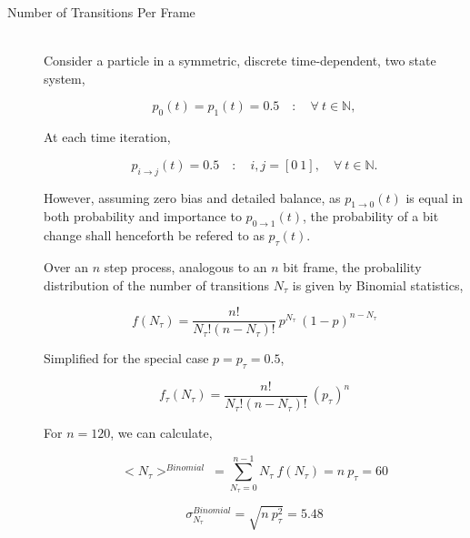 			\begin{description}
				\item[Number of Transitions Per Frame] \hfill \\
					
					Consider a particle in a symmetric, discrete time-dependent, two state system,

					\begin{equation}
						p_0(t) = p_1(t) = 0.5 \quad : \quad \forall\ t \in \mathbb{N},
					\end{equation}

					At each time iteration,

					\begin{equation}
						p_{i \to j}(t) = 0.5 \quad : \quad i,j = [0\ 1], \quad \forall\ t \in \mathbb{N}.
					\end{equation}

					However, assuming zero bias and detailed balance, as $p_{1 \to 0}(t)$ is equal in both probability and importance to $p_{0 \to 1}(t)$, the probability of a bit change shall henceforth be refered to as $p_{\tau}(t)$.
					\par
					Over an $n$ step process, analogous to an $n$ bit frame, the probalility distribution of the number of transitions $N_\tau$ is given by Binomial statistics,

					\begin{equation}
						f(N_{\tau}) = \frac{n!}{N_{\tau}!(n-N_{\tau})!}\ p^{N_{\tau}}\ (1 - p)^{n-N_{\tau}}
					\end{equation}

					Simplified for the special case $p = p_{\tau} = 0.5$,

					\begin{equation}
						f_{\tau}(N_{\tau}) = \frac{n!}{N_{\tau}!(n-N_{\tau})!}\ (p_{\tau})^{n}
						\label{eqn:transition_propability_dencity}
					\end{equation}

					For $n = 120$, we can calculate,

					\begin{equation}
						<N_\tau>^{Binomial} \ = \sum_{N_{\tau}=0}^{n-1} N_{\tau}\ f(N_{\tau}) = n\ p_{\tau} = 60
						\label{eqn:tansition_expectation}
					\end{equation}

					\begin{equation}
						\sigma_{N_\tau}^{Binomial} = \sqrt{ n\ p_{\tau}^2} = 5.48
					\end{equation}


\end{description}

